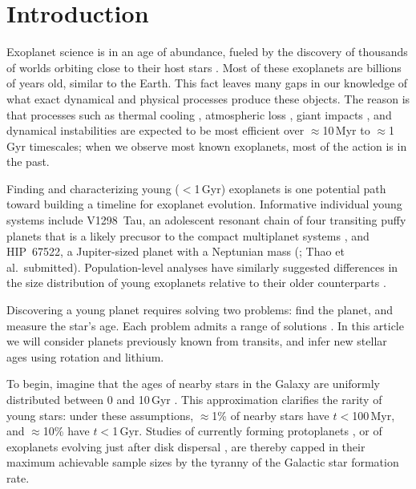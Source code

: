 \documentclass[11pt,twocolumn,tighten]{aastex63}
\begin{document}
\section{Introduction}
\label{sec:intro}

Exoplanet science is in an age of abundance, fueled by the discovery
of thousands of worlds orbiting close to their host stars
\citep{Borucki10,2015JATIS...1a4003R}.  Most of these exoplanets are
billions of years old, similar to the Earth.  This fact leaves many
gaps in our knowledge of what exact dynamical and physical processes
produce these objects.    The reason is that processes such as thermal
cooling \citep{2007ApJ...659.1661F}, atmospheric loss
\citep{2019AREPS..47...67O}, giant impacts
\citep{2014prpl.conf..595R}, and dynamical instabilities
\citep{2017MNRAS.470.1750I} are expected to be most efficient over
$\approx$10\,Myr to $\approx$1\,Gyr timescales; when we observe most
known exoplanets, most of the action is in the past.

Finding and characterizing young ($<$1\,Gyr) exoplanets is one
potential path toward building a timeline for exoplanet evolution.
Informative individual young systems include V1298~Tau, an adolescent
resonant chain of four transiting puffy planets that is a likely
precusor to the compact multiplanet systems \citep{David_2019}, and
HIP~67522, a Jupiter-sized planet with a Neptunian mass
(\citealt{Rizzuto_2020}; Thao et al.~submitted).  Population-level
analyses have similarly suggested differences in the size distribution
of young exoplanets relative to their older counterparts
\citep{Berger_2020b_rpage,David_2021,Sandoval_2021,2023AJ....166..248C,2024arXiv240303261V}.

Discovering a young planet requires solving two problems: find the
planet, and measure the star's age.  Each problem admits a range of
solutions \citep[e.g.][]{2008Sci...322.1348M,2012ApJ...756L..33Q}.  In
this article we will consider planets previously known from transits,
and infer new stellar ages using rotation and lithium.

To begin, imagine that the ages of nearby stars in the Galaxy are
uniformly distributed between 0 and 10\,Gyr
\citep[e.g.~Fig~17 of][]{Nordstrom_2004}.  This approximation clarifies the
rarity of young stars: under these assumptions, $\approx$1\% of nearby
stars have $t$$<$100\,Myr, and $\approx$10\% have $t$$<$1\,Gyr.
Studies of currently forming protoplanets \citep{2018A&A...617A..44K},
or of exoplanets evolving just after disk dispersal
\citep[e.g.][]{2022MNRAS.512.5067K}, are thereby capped in their
maximum achievable sample sizes by the tyranny of the Galactic star
formation rate.
\end{document}
